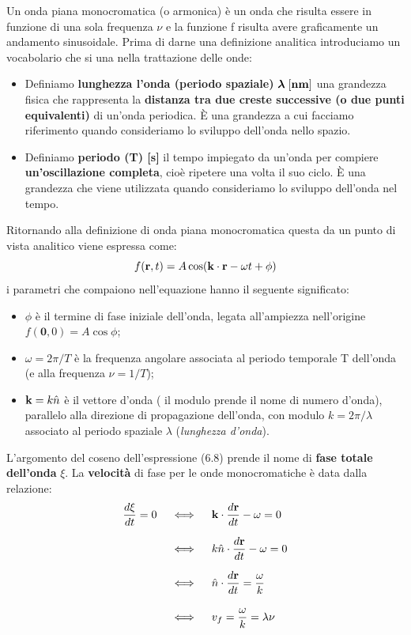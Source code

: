 Un onda piana monocromatica (o armonica) \`e un onda che risulta essere in funzione di una sola frequenza $\nu$ e la funzione f risulta avere graficamente un andamento sinusoidale.  Prima di darne una definizione analitica introduciamo un vocabolario che si una nella trattazione delle onde:
\begin{itemize}
	\item Definiamo \textbf{lunghezza l'onda (periodo spaziale)} $\bm{\lambda} \;\bold{[nm]}$ una grandezza fisica che rappresenta la \textbf{distanza tra due creste successive (o due punti equivalenti)} di un'onda periodica. \`E una grandezza a cui facciamo riferimento quando consideriamo lo sviluppo dell'onda nello spazio.
	\item Definiamo \textbf{periodo (T) [s]} il tempo impiegato da un'onda per compiere \textbf{un'oscillazione completa}, cio\`e ripetere una volta il suo ciclo. \`E una grandezza che viene utilizzata quando consideriamo lo sviluppo dell'onda nel tempo.
\end{itemize} 
Ritornando alla definizione di onda piana monocromatica questa da un punto di vista analitico viene espressa come:
\begin{equation}
	f(\bold{r},t) = A \cos(\bold{k} \cdot \bold{r} - \omega t + \phi)
\end{equation}
i parametri che compaiono nell'equazione hanno il seguente significato:
\begin{itemize}
	\item $\phi$ \`e il termine di fase iniziale dell'onda, legata all'ampiezza nell'origine $f(\bm{0},0)=A\cos \phi$;
	\item $\omega  =2 \pi /T$ \`e la frequenza angolare associata al periodo temporale T dell'onda (e alla frequenza $\nu = 1/T$);
	\item $\bold{k} = k \hat{n}$ \`e il vettore d'onda ( il modulo prende il nome di numero d'onda), parallelo alla direzione di propagazione dell'onda, con modulo $k = 2\pi / \lambda$ associato al periodo spaziale $\lambda$ (\textit{lunghezza d'onda}).
\end{itemize}
L'argomento del coseno dell'espressione (6.8) prende il nome di \textbf{fase totale dell'onda} $\xi$. La \textbf{velocit\`a} di fase per le onde monocromatiche \`e data dalla relazione:
\begin{align*}
	\frac{d \xi}{dt} = 0 \quad & \iff \quad \bold{k} \cdot \frac{d \bold{r}}{dt} - \omega = 0 \\ \rule{0pt}{20pt}
	& \iff \quad k \hat{n} \cdot \frac{d \bold{r}}{dt} - \omega = 0 \\ \rule{0pt}{20pt}
	& \iff \quad \hat{n} \cdot \frac{d \bold{r}}{dt} = \frac{\omega}{k} \\ \rule{0pt}{20pt}
	& \iff \quad v_{f} = \frac{\omega}{k} = \lambda \nu
\end{align*} 
